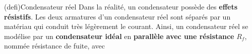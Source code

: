 \documentclass[../../main/main.tex]{subfiles}
\begin{document}
\begin{tcb}[sidebyside, righthand ratio=.3](defi){Condensateur réel}
	Dans la réalité, un condensateur possède des \textbf{effets résistifs}.
	Les deux armatures d'un condensateur réel sont séparés par un matériau qui
	conduit très légèrement le courant. Ainsi, un condensateur réel se
	modélise par un \textbf{condensateur idéal} en \textbf{parallèle avec une
		résistance} $R_f$, nommée résistance de fuite, avec
	\vspace{-15pt}
	\tcblower
	\begin{center}
		\vspace{-15pt}
		\label{fig:creel}
	\end{center}
\end{tcb}
\end{document}
